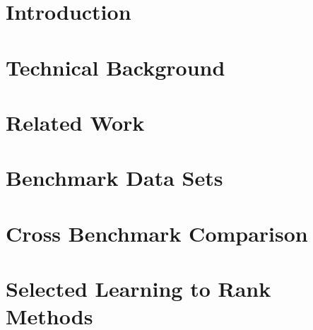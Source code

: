 



\frenchspacing
\raggedbottom
{} %
\pagestyle{plain}




\pagestyle{scrheadings}
\cleardoublepage
\cleardoublepage
\chapter{Introduction}
 
\chapter{Technical Background}

\chapter{Related Work}

\chapter{Benchmark Data Sets}

\chapter{Cross Benchmark Comparison}

\chapter{Selected Learning to Rank Methods}

